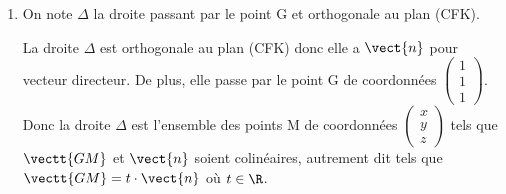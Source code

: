 \begin{enumerate}
\begin{enumerate}

Le vecteur $\vect{n}$ est donc orthogonal à deux vecteurs directeurs du plan (CFK) donc c'est un vecteur normal au plan (CFK).

		\item  %
Le plan (CFK) est l'ensemble des points M de coordonnées
$\begin{pmatrix}
x \\ y \\ z
\end{pmatrix}$
tels que $\vectt{CM}$ et $\vect{n}$ soient orthogonaux, c'est-à-dire tels que $\vectt{CM}\cdot\vect{n}=0$.

$\vectt{CM}$ a pour coordonnées 
$\begin{pmatrix}
x-1 \\ y-1 \\ z
\end{pmatrix}$.

$\vectt{CM}\cdot\vect{n}=0
\iff
(x-1)\times 1 + (y-1)\times 2 + z\times 1=0\\
\phantom{\vectt{CM}\cdot\vectt{n}=0}
\iff
x-1+2y-2+z=0
\iff
x+2y+z-3=0$

Le plan (CFK) a donc pour équation cartésienne $x+2y+z-3=0$.

	\end{enumerate}
	
\item On note $\Delta$ la droite passant par le point G et orthogonale au plan (CFK). 


La droite $\Delta$ est orthogonale au plan (CFK) donc elle a $\vect{n}$ pour vecteur directeur.
De plus, elle passe par le point G de coordonnées
$\begin{pmatrix}
1 \\ 1 \\ 1
\end{pmatrix}$.
Donc la droite $\Delta$ est l'ensemble des points M de coordonnées
$\begin{pmatrix}
x \\ y \\ z
\end{pmatrix}$
tels que $\vectt{GM}$ et $\vect{n}$ soient colinéaires, autrement dit tels que $\vectt{GM}=t\cdot\vect{n}$ où $t\in\R$.


\end{enumerate}
